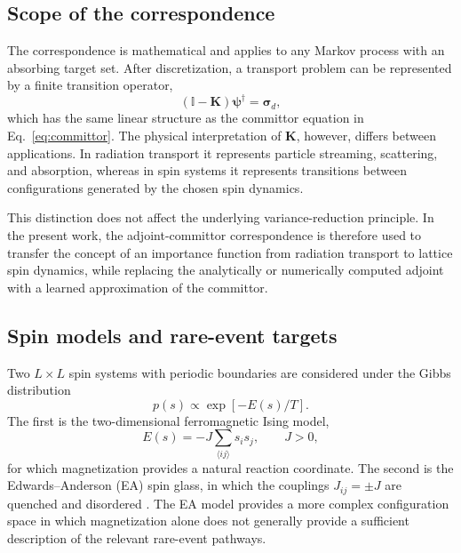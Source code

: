 \documentclass[a4paper,fleqn]{cas-sc}
\let\Oldsubsection\subsection
\renewcommand{\subsection}{\FloatBarrier\Oldsubsection}
\begin{document}
	\subsection{Scope of the correspondence}\label{sec:scope}
	
	The correspondence is mathematical and applies to any Markov process with an absorbing target set. After discretization, a transport problem can be represented by a finite transition operator,
	\begin{equation}
		(\mathbb I-\mathbf K)\boldsymbol{\psi}^{\dagger}
		=\boldsymbol{\sigma}_d ,
	\end{equation}
	which has the same linear structure as the committor equation in Eq.~\eqref{eq:committor}. The physical interpretation of $\mathbf K$, however, differs between applications. In radiation transport it represents particle streaming, scattering, and absorption, whereas in spin systems it represents transitions between configurations generated by the chosen spin dynamics.
	
	This distinction does not affect the underlying variance-reduction principle. In the present work, the adjoint-committor correspondence is therefore used to transfer the concept of an importance function from radiation transport to lattice spin dynamics, while replacing the analytically or numerically computed adjoint with a learned approximation of the committor.
	
	\subsection{Spin models and rare-event targets}\label{sec:models}
	
	Two $L\times L$ spin systems with periodic boundaries are considered under the Gibbs distribution
	\begin{equation}
		p(s)\propto \exp[-E(s)/T].
	\end{equation}
	The first is the two-dimensional ferromagnetic Ising model,
	\begin{equation}
		E(s)=-J\sum_{\langle ij\rangle}s_i s_j,\qquad J>0,
	\end{equation}
	for which magnetization provides a natural reaction coordinate. The second is the Edwards--Anderson (EA) spin glass, in which the couplings $J_{ij}=\pm J$ are quenched and disordered \cite{edwards1975,binder1986}. The EA model provides a more complex configuration space in which magnetization alone does not generally provide a sufficient description of the relevant rare-event pathways.
	
\end{document}
